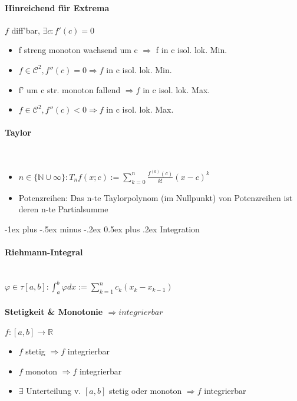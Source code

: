 \documentclass[paper=a3,paper=landscape, fontsize=9pt, DIV=30]{scrartcl}
\makeatletter
\newcommand{\real}{{\mathbb{R}}}
\newcommand{\nat}{\mathbb{N}}
\renewcommand{\section}{\@startsection{section}{1}{0mm}%
  {-1ex plus -.5ex minus -.2ex}%
  {0.5ex plus .2ex}%
  {\color{blue}\normalfont\large\bfseries}}
\makeatother
\begin{document}
\begin{multicols*}{4}
  \paragraph{Hinreichend für Extrema}
  $f$ diff'bar, $\exists c: f'(c)=0$
  \begin{itemize}
  \item f streng monoton wachsend um c $\Rightarrow$ f in c isol. lok. Min.
  \item $f \in \mathscr{C}^2, f''(c)=0 \Rightarrow f$ in c isol. lok. Min.
  \item f' um c str. monoton fallend $\Rightarrow f$ in c isol. lok. Max.
  \item $f \in \mathscr{C}^2, f''(c)<0 \Rightarrow f$ in c isol. lok. Max.
  \end{itemize}


  \paragraph{Taylor}\hspace{0pt} \\
  \begin{itemize}
  	\item $ n \in \{\nat \cup \infty\}: T_nf(x;c):= \sum_{k=0}^{n}\frac{f^{(k)}(c)}{k!}(x-c)^k$
  	\item Potenzreihen: Das n-te Taylorpolynom (im Nullpunkt) von Potenzreihen ist deren n-te Partialsumme
  \end{itemize}

  
  \section{Integration}


  \paragraph{Riehmann-Integral}\hspace{0pt} \\
  $\varphi \in \tau [a,b]: \int_{a}^{b}\varphi dx := \sum_{k=1}^{n}c_k(x_k-x_{k-1})$


  \paragraph{Stetigkeit \& Monotonie $\Rightarrow integrierbar$} $f: [a,b] \rightarrow \real$
  \begin{itemize}
  \item $f$ stetig $\Rightarrow f$ integrierbar
  \item $f$ monoton $\Rightarrow f$ integrierbar
  \item $\exists$ Unterteilung v. $[a,b]$ stetig oder monoton $\Rightarrow f$ integrierbar
  \end{itemize}



\end{multicols*}
\end{document}
